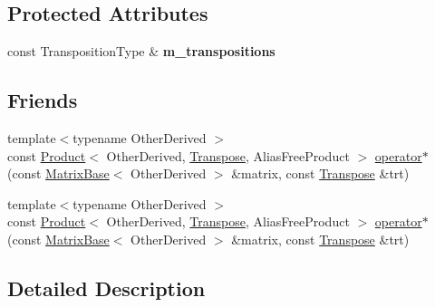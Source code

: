 \subsection*{Protected Attributes}
\begin{DoxyCompactItemize}
\item 
\mbox{\label{class_eigen_1_1_transpose_3_01_transpositions_base_3_01_transpositions_derived_01_4_01_4_a4b14ba5ef3717104600febc242f15c2e}} 
const Transposition\+Type \& {\bfseries m\+\_\+transpositions}
\end{DoxyCompactItemize}
\subsection*{Friends}
\begin{DoxyCompactItemize}
\item 
{\footnotesize template$<$typename Other\+Derived $>$ }\\const \hyperlink{group___core___module_class_eigen_1_1_product}{Product}$<$ Other\+Derived, \hyperlink{group___core___module_class_eigen_1_1_transpose}{Transpose}, Alias\+Free\+Product $>$ \hyperlink{class_eigen_1_1_transpose_3_01_transpositions_base_3_01_transpositions_derived_01_4_01_4_af58db34e3932489e71803efae5dd3207}{operator$\ast$} (const \hyperlink{group___core___module_class_eigen_1_1_matrix_base}{Matrix\+Base}$<$ Other\+Derived $>$ \&matrix, const \hyperlink{group___core___module_class_eigen_1_1_transpose}{Transpose} \&trt)
\item 
{\footnotesize template$<$typename Other\+Derived $>$ }\\const \hyperlink{group___core___module_class_eigen_1_1_product}{Product}$<$ Other\+Derived, \hyperlink{group___core___module_class_eigen_1_1_transpose}{Transpose}, Alias\+Free\+Product $>$ \hyperlink{class_eigen_1_1_transpose_3_01_transpositions_base_3_01_transpositions_derived_01_4_01_4_af58db34e3932489e71803efae5dd3207}{operator$\ast$} (const \hyperlink{group___core___module_class_eigen_1_1_matrix_base}{Matrix\+Base}$<$ Other\+Derived $>$ \&matrix, const \hyperlink{group___core___module_class_eigen_1_1_transpose}{Transpose} \&trt)
\end{DoxyCompactItemize}


\subsection{Detailed Description}
